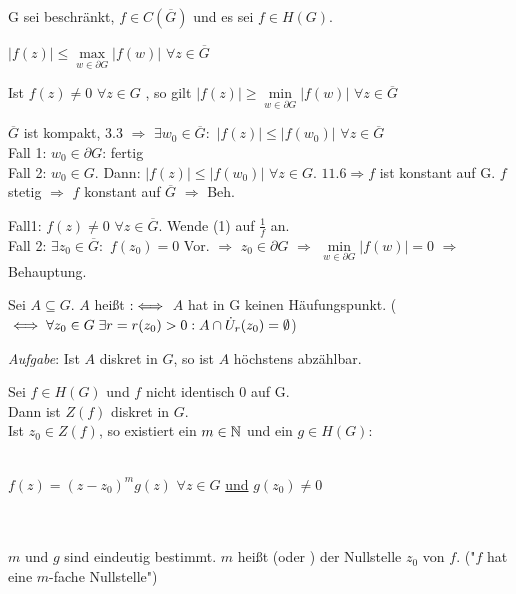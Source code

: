 \documentclass[a4paper,twoside,DIV15,BCOR12mm]{scrbook}
\begin{document}
\begin{satz}
G sei beschränkt, $f \in C(\overline{G})$ und es sei $f \in H(G)$.
\begin{liste}
\item $|f(z)|  \leq \max\limits_{w \in \partial G} |f(w)| $ $\forall z \in
\overline{G}$ 
\item Ist $f(z) \neq 0$ $\forall z \in G$ , so gilt $|f(z)| \geq \min\limits_{w
\in \partial G} |f(w)|$ $\forall z \in \overline{G}$
\end{liste}
\end{satz} 
\begin{beweis}
\begin{liste}
\item $\overline{G}$ ist kompakt, 3.3 $\Rightarrow $ $\exists w_0 \in
\overline{G}:$ $|f(z)| \leq |f(w_0)|$ $\forall z \in \overline{G}$ \\
Fall 1: $w_0 \in \partial G$: fertig \\
Fall 2: $w_0 \in G.$  Dann: $|f(z)| \leq |f(w_0)|$ $\forall z \in G.$ $11.6
\Rightarrow f$ ist konstant auf G. $f$ stetig $\Rightarrow$ $f$ konstant auf
$\overline{G}$ $\Rightarrow$ Beh.
\item Fall1: $f(z) \neq 0$ $\forall z \in \overline{G}$. Wende (1) auf
$\frac{1}{f}$ an. \\
Fall 2: $\exists z_0 \in \overline{G}: $ $f(z_0) = 0$ Vor. $\Rightarrow$ $z_0
\in \partial G$ $\Rightarrow$ $\min\limits_{w\in\partial G} |f(w)| = 0$
$\Rightarrow $ Behauptung. 
\end{liste}
\end{beweis}

\begin{definition}
Sei $A \subseteq G$. $A$ heißt  $:\iff$ $A$ hat in G
keinen Häufungspunkt. ($\iff \forall z_0 \in G \;\exists r = r(z_0) > 0 : A \cap
\dot{U}_r(z_0) = \emptyset$)
\end{definition}
\emph{Aufgabe}: Ist $A$ diskret in $G$, so ist $A$ höchstens abzählbar.

\begin{satz}
Sei $f \in H(G)$ und $f$ nicht identisch $0$ auf G. \\
Dann ist $Z(f)$ diskret in $G$. \\
Ist $z_0 \in Z(f)$, so existiert ein $m \in \mathbb{N}$ und ein $g \in H(G)$: \\ \\ 
\centerline{$f(z)
= (z-z_0)^m g(z)$ $\forall z \in G$ \underline{und} $g(z_0) \neq 0$} \\ \\$m$ und
$g$ sind eindeutig bestimmt. $m$ heißt  (oder
) der Nullstelle $z_0$ von $f$. ("$f$ hat eine $m$-fache Nullstelle")
\end{satz}
\end{document}
